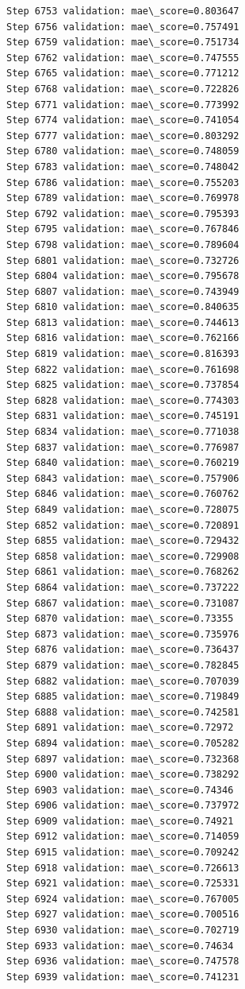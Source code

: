 \documentclass[11pt]{article}
\begin{document}
\begin{Verbatim}[commandchars=\\\{\}]
Step 6753 validation: mae\_score=0.803647
Step 6756 validation: mae\_score=0.757491
Step 6759 validation: mae\_score=0.751734
Step 6762 validation: mae\_score=0.747555
Step 6765 validation: mae\_score=0.771212
Step 6768 validation: mae\_score=0.722826
Step 6771 validation: mae\_score=0.773992
Step 6774 validation: mae\_score=0.741054
Step 6777 validation: mae\_score=0.803292
Step 6780 validation: mae\_score=0.748059
Step 6783 validation: mae\_score=0.748042
Step 6786 validation: mae\_score=0.755203
Step 6789 validation: mae\_score=0.769978
Step 6792 validation: mae\_score=0.795393
Step 6795 validation: mae\_score=0.767846
Step 6798 validation: mae\_score=0.789604
Step 6801 validation: mae\_score=0.732726
Step 6804 validation: mae\_score=0.795678
Step 6807 validation: mae\_score=0.743949
Step 6810 validation: mae\_score=0.840635
Step 6813 validation: mae\_score=0.744613
Step 6816 validation: mae\_score=0.762166
Step 6819 validation: mae\_score=0.816393
Step 6822 validation: mae\_score=0.761698
Step 6825 validation: mae\_score=0.737854
Step 6828 validation: mae\_score=0.774303
Step 6831 validation: mae\_score=0.745191
Step 6834 validation: mae\_score=0.771038
Step 6837 validation: mae\_score=0.776987
Step 6840 validation: mae\_score=0.760219
Step 6843 validation: mae\_score=0.757906
Step 6846 validation: mae\_score=0.760762
Step 6849 validation: mae\_score=0.728075
Step 6852 validation: mae\_score=0.720891
Step 6855 validation: mae\_score=0.729432
Step 6858 validation: mae\_score=0.729908
Step 6861 validation: mae\_score=0.768262
Step 6864 validation: mae\_score=0.737222
Step 6867 validation: mae\_score=0.731087
Step 6870 validation: mae\_score=0.73355
Step 6873 validation: mae\_score=0.735976
Step 6876 validation: mae\_score=0.736437
Step 6879 validation: mae\_score=0.782845
Step 6882 validation: mae\_score=0.707039
Step 6885 validation: mae\_score=0.719849
Step 6888 validation: mae\_score=0.742581
Step 6891 validation: mae\_score=0.72972
Step 6894 validation: mae\_score=0.705282
Step 6897 validation: mae\_score=0.732368
Step 6900 validation: mae\_score=0.738292
Step 6903 validation: mae\_score=0.74346
Step 6906 validation: mae\_score=0.737972
Step 6909 validation: mae\_score=0.74921
Step 6912 validation: mae\_score=0.714059
Step 6915 validation: mae\_score=0.709242
Step 6918 validation: mae\_score=0.726613
Step 6921 validation: mae\_score=0.725331
Step 6924 validation: mae\_score=0.767005
Step 6927 validation: mae\_score=0.700516
Step 6930 validation: mae\_score=0.702719
Step 6933 validation: mae\_score=0.74634
Step 6936 validation: mae\_score=0.747578
Step 6939 validation: mae\_score=0.741231

\end{Verbatim}
\end{document}
